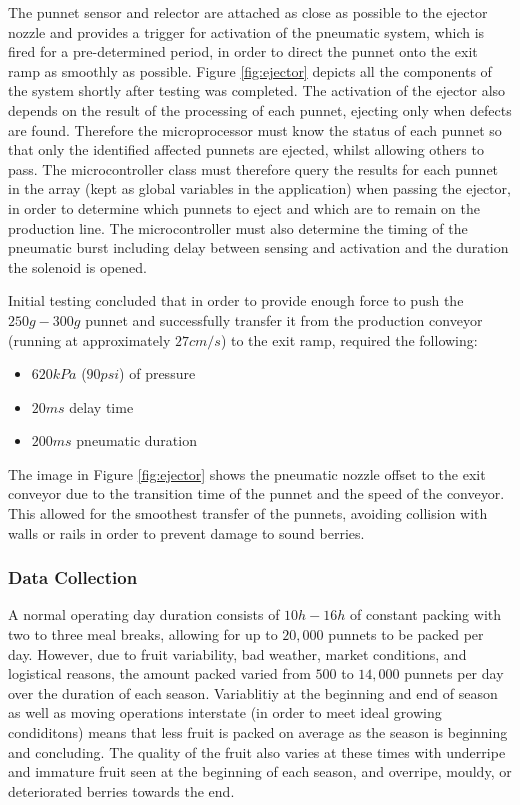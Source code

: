 \documentclass[fleqn,twoside]{article}
\begin{document}
The punnet sensor and relector are attached as close as possible to the ejector nozzle and provides a trigger for activation of the pneumatic system, which is fired for a pre-determined period, in order to direct the punnet onto the exit ramp as smoothly as possible. Figure \ref{fig:ejector} depicts all the components of the system shortly after testing was completed. The activation of the ejector also depends on the result of the processing of each punnet, ejecting only when defects are found. Therefore the microprocessor must know the status of each punnet so that only the identified affected punnets are ejected, whilst allowing others to pass. The microcontroller class must therefore query the results for each punnet in the array (kept as global variables in the application) when passing the ejector, in order to determine which punnets to eject and which are to remain on the production line. The microcontroller must also determine the timing of the pneumatic burst including delay between sensing and activation and the duration the solenoid is opened. 

Initial testing concluded that in order to provide enough force to push the $250g-300g$ punnet and successfully transfer it from the production conveyor (running at approximately $27cm/s$) to the exit ramp, required the following:
\begin{itemize}
	\item $620kPa$ ($90psi$) of pressure
	\item $20ms$ delay time
	\item $200ms$ pneumatic duration
\end{itemize}

The image in Figure \ref{fig:ejector} shows the pneumatic nozzle offset to the exit conveyor due to the transition time of the punnet and the speed of the conveyor. This allowed for the smoothest transfer of the punnets, avoiding collision with walls or rails in order to prevent damage to sound berries.


\subsubsection{Data Collection}

A normal operating day duration consists of $10h-16h$ of constant packing with two to three meal breaks, allowing for up to $20,000$ punnets to be packed per day. However, due to fruit variability, bad weather, market conditions, and logistical reasons, the amount packed varied from $500$ to $14,000$ punnets per day over the duration of each season. Variablitiy at the beginning and end of season as well as moving operations interstate (in order to meet ideal growing condiditons) means that less fruit is packed on average as the season is beginning and concluding. The quality of the fruit also varies at these times with underripe and immature fruit seen at the beginning of each season, and overripe, mouldy, or deteriorated berries towards the end.
\end{document}
